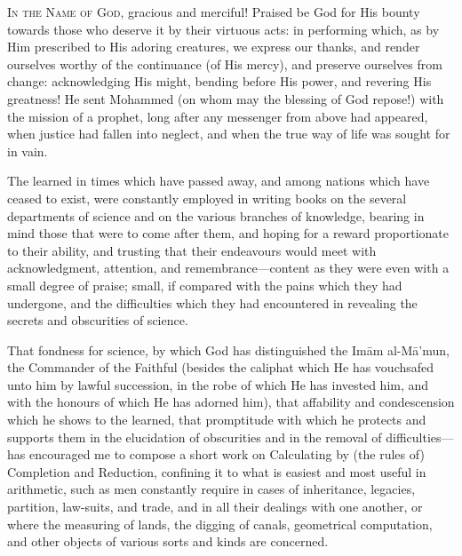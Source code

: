 \documentclass[11pt,a4paper,openany,oneside]{book}
\begin{document}
\begin{minipage}[t]{0.48\textwidth}
\raggedright

\lettrine[lines=2, lhang=0.33, nindent=0em, findent=3pt, loversize=0.14]{
\textcolor{dropgold}{I}}{n the Name of God,} gracious and merciful! Praised be God for His bounty towards those who deserve it by their virtuous acts: in performing which, as by Him prescribed to His adoring creatures, we express our thanks, and render ourselves worthy of the continuance (of His mercy), and preserve ourselves from change: acknowledging His might, bending before His power, and revering His greatness! He sent Mohammed (on whom may the blessing of God repose!) with the mission of a prophet, long after any messenger from above had appeared, when justice had fallen into neglect, and when the true way of life was sought for in vain.

\vspace{0.3cm}

The learned in times which have passed away, and among nations which have ceased to exist, were constantly employed in writing books on the several departments of science and on the various branches of knowledge, bearing in mind those that were to come after them, and hoping for a reward proportionate to their ability, and trusting that their endeavours would meet with acknowledgment, attention, and remembrance---content as they were even with a small degree of praise; small, if compared with the pains which they had undergone, and the difficulties which they had encountered in revealing the secrets and obscurities of science.

\vspace{0.3cm}

That fondness for science, by which God has distinguished the Im\=am al-M\=a'mun, the Commander of the Faithful (besides the caliphat which He has vouchsafed unto him by lawful succession, in the robe of which He has invested him, and with the honours of which He has adorned him), that affability and condescension which he shows to the learned, that promptitude with which he protects and supports them in the elucidation of obscurities and in the removal of difficulties---has encouraged me to compose a short work on Calculating by (the rules of) Completion and Reduction, confining it to what is easiest and most useful in arithmetic, such as men constantly require in cases of inheritance, legacies, partition, law-suits, and trade, and in all their dealings with one another, or where the measuring of lands, the digging of canals, geometrical computation, and other objects of various sorts and kinds are concerned.

\end{minipage}
\vspace{0.3cm}
\end{document}
